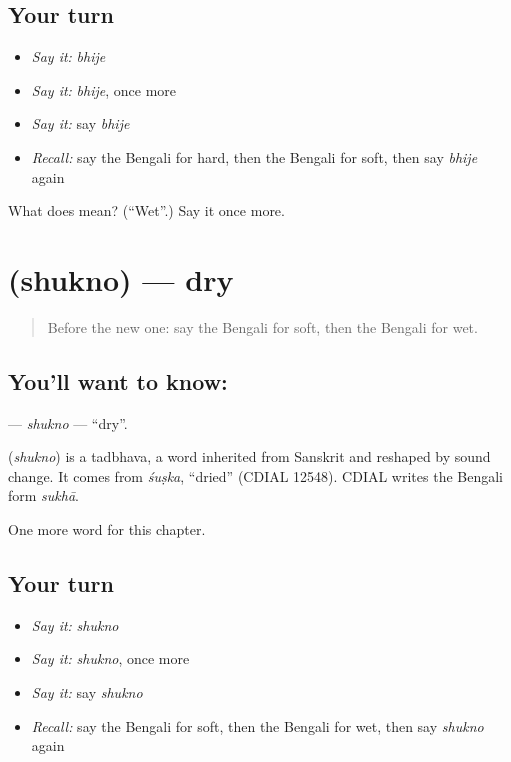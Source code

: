 \subsection*{Your turn}
\begin{itemize}
\raggedright
  \item \emph{Say it:} \emph{bhije}
  \item \emph{Say it:} \emph{bhije}, once more
  \item \emph{Say it:} say \emph{bhije}
  \item \emph{Recall:} say the Bengali for hard, then the Bengali for soft, then say \emph{bhije} again
\end{itemize}

\begin{tcolorbox}[breakable,colback=teal!4,colframe=teal!35!black,title={Before you move on}]
What does  mean? (\textquotedblleft{}Wet\textquotedblright{}.) Say it once more.
\end{tcolorbox}
\section[\texorpdfstring{\bn{শুকনো} (shukno)}{শুকনো (shukno)}]{ (shukno) — dry}

\label{lesson:BN-C135-shukno}



\begin{quote}
Before the new one: say the Bengali for soft, then the Bengali for wet.
\end{quote}

\subsection*{You'll want to know: }
\textbf{} — \emph{shukno} — \textquotedblleft{}dry\textquotedblright{}.

\begin{cousinweb}
\textbf{} (\emph{shukno}) is a tadbhava, a word inherited from Sanskrit and reshaped by sound change. It comes from \emph{śuṣka}, \textquotedblleft{}dried\textquotedblright{} (CDIAL 12548). CDIAL writes the Bengali form \emph{sukhā}.
\end{cousinweb}

\begin{grammarlens}[title={What you've built}]
One more word for this chapter.
\end{grammarlens}

\subsection*{Your turn}
\begin{itemize}
\raggedright
  \item \emph{Say it:} \emph{shukno}
  \item \emph{Say it:} \emph{shukno}, once more
  \item \emph{Say it:} say \emph{shukno}
  \item \emph{Recall:} say the Bengali for soft, then the Bengali for wet, then say \emph{shukno} again
\end{itemize}

